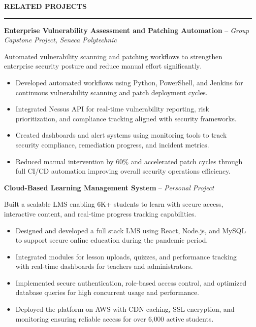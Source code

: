 \documentclass[10pt,letterpaper]{article}
\begin{document}
\vspace{6pt}

\textbf{RELATED PROJECTS}\\[-8pt]
\noindent\rule{\textwidth}{1pt}

\vspace{-2pt}

\textbf{Enterprise Vulnerability Assessment and Patching Automation} -- \emph{Group Capstone Project, Seneca Polytechnic }

\vspace{-1pt}

Automated vulnerability scanning and patching workflows to strengthen enterprise security posture and reduce manual effort significantly.
\vspace{-1pt}
\begin{itemize}
\item Developed automated workflows using Python, PowerShell, and Jenkins for continuous vulnerability scanning and patch deployment cycles.
\item Integrated Nessus API for real-time vulnerability reporting, risk prioritization, and compliance tracking aligned with security frameworks.
\item Created dashboards and alert systems using monitoring tools to track security compliance, remediation progress, and incident metrics.
\item Reduced manual intervention by 60\% and accelerated patch cycles through full CI/CD automation improving overall security operations efficiency.
\end{itemize}

\textbf{Cloud-Based Learning Management System} -- \emph{Personal Project}

\vspace{-1pt}

Built a scalable LMS enabling 6K+ students to learn with secure access, interactive content, and real-time progress tracking capabilities.
\vspace{-1pt}
\begin{itemize}
\item Designed and developed a full stack LMS using React, Node.js, and MySQL to support secure online education during the pandemic period.
\item Integrated modules for lesson uploads, quizzes, and performance tracking with real-time dashboards for teachers and administrators.
\item Implemented secure authentication, role-based access control, and optimized database queries for high concurrent usage and performance.
\item Deployed the platform on AWS with CDN caching, SSL encryption, and monitoring ensuring reliable access for over 6,000 active students.
\end{itemize}
\end{document}
